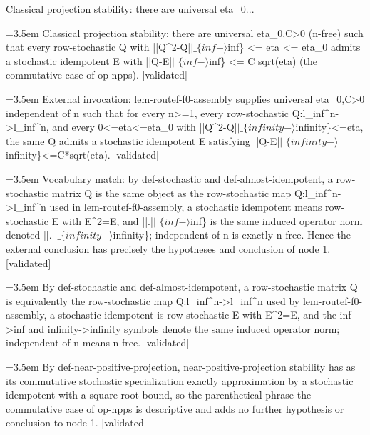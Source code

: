 \documentclass{article}
\newcommand{\step}[1]{\par\noindent\hangindent=3.5em\hangafter=1%
  \makebox[3.5em][l]{\textbf{#1.}}}
\newcommand{\steptag}[1]{\hfill{\small\textsf{[#1]}}}
\begin{document}
\begin{proofbox}{Classical projection stability: there are universal eta\_0...}
\step{1} Classical projection stability: there are universal eta\_0,C>0 (n-free) such that every row-stochastic Q with ||Q\textasciicircum{}2-Q|$|\_\{inf-\rangle$inf\} <= eta <= eta\_0 admits a stochastic idempotent E with ||Q-E|$|\_\{inf-\rangle$inf\} <= C sqrt(eta) (the commutative case of op-npps). \steptag{validated} \\[6pt]
\step{1.1} External invocation: lem-routef-f0-assembly supplies universal eta\_0,C>0 independent of n such that for every n>=1, every row-stochastic Q:l\_inf\textasciicircum{}n->l\_inf\textasciicircum{}n, and every 0<=eta<=eta\_0 with ||Q\textasciicircum{}2-Q|$|\_\{infinity-\rangle$infinity\}<=eta, the same Q admits a stochastic idempotent E satisfying ||Q-E|$|\_\{infinity-\rangle$infinity\}<=C*sqrt(eta). \steptag{validated} \\[4pt]
\step{1.2} Vocabulary match: by def-stochastic and def-almost-idempotent, a row-stochastic matrix Q is the same object as the row-stochastic map Q:l\_inf\textasciicircum{}n->l\_inf\textasciicircum{}n used in lem-routef-f0-assembly, a stochastic idempotent means row-stochastic E with E\textasciicircum{}2=E, and ||.|$|\_\{inf-\rangle$inf\} is the same induced operator norm denoted ||.|$|\_\{infinity-\rangle$infinity\}; independent of n is exactly n-free. Hence the external conclusion has precisely the hypotheses and conclusion of node 1. \steptag{validated} \\[6pt]
\step{1.2.1} By def-stochastic and def-almost-idempotent, a row-stochastic matrix Q is equivalently the row-stochastic map Q:l\_inf\textasciicircum{}n->l\_inf\textasciicircum{}n used by lem-routef-f0-assembly, a stochastic idempotent is row-stochastic E with E\textasciicircum{}2=E, and the inf->inf and infinity->infinity symbols denote the same induced operator norm; independent of n means n-free. \steptag{validated} \\[4pt]
\step{1.2.2} By def-near-positive-projection, near-positive-projection stability has as its commutative stochastic specialization exactly approximation by a stochastic idempotent with a square-root bound, so the parenthetical phrase the commutative case of op-npps is descriptive and adds no further hypothesis or conclusion to node 1. \steptag{validated} \\[4pt]
\end{proofbox}
\end{document}

